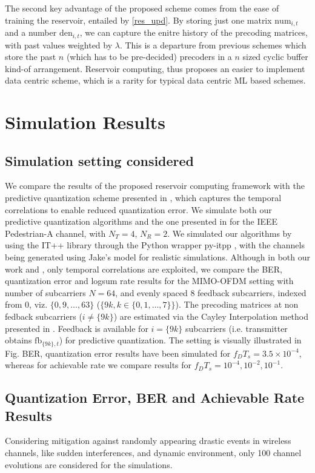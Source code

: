 \documentclass[conference]{IEEEtran}
\begin{document}
The second key advantage of the proposed scheme comes from the ease of training the reservoir, entailed by \eqref{res_upd}.
By storing just one matrix $\text{num}_{i,t}$ and a number $\text{den}_{i,t}$, we can capture the enitre history of the precoding matrices, with past values weighted by $\lambda$.
This is a departure from previous schemes \cite{Gupt1905:Predictive,6891198,6545375} which store the past $n$ (which has to be pre-decided) precoders in a $n$ sized cyclic buffer kind-of arrangement.
Reservoir computing, thus proposes an easier to implement data centric scheme, which is a rarity for typical data centric ML based schemes.


\section{Simulation Results}
\label{section4}
\subsection{Simulation setting considered}
\label{setting}
\noindent We compare the results of the proposed reservoir computing framework with the predictive quantization scheme presented in \cite{6891198}, which captures the temporal correlations to enable reduced quantization error.
We simulate both our predictive quantization algorithms and the one presented in \cite{6891198} for the IEEE Pedestrian-A channel, with $N_T=4$, $N_R=2$. We simulated our algorithms by using the IT++ library through the Python wrapper py-itpp \cite{ViditPy}, with the channels being generated using Jake’s model for realistic simulations. Although in both our work and \cite{6891198}, only temporal correlations are exploited, we compare the BER, quantization error and logsum rate results for the MIMO-OFDM setting with number of subcarriers $N=64$, and evenly spaced $8$ feedback subcarriers, indexed from 0, viz. $\{0,9,\ldots,63\}$ ($\{9k, k \in \{0,1,\ldots,7\}\}$). The precoding matrices at non fedback subcarriers ($i\neq\{9k\}$) are estimated via the Cayley Interpolation method presented in \cite{Gupt1905:Predictive}. Feedback is available for $i=\{9k\}$ subcarriers (i.e. transmitter obtains $\text{fb}_{\{9k\},t}$) for predictive quantization. The setting is visually illustrated in Fig. BER, quantization error results have been simulated for $f_DT_s=3.5\times10^{-4}$, whereas for achievable rate we compare results for $f_DT_s=10^{-4},10^{-2},10^{-1}$. 
\newpage
\subsection{Quantization Error, BER and Achievable Rate Results}
Considering mitigation against randomly appearing drastic events in wireless channels, like sudden interferences, and dynamic environment, only 100 channel evolutions are considered for the simulations. 
\label{res}
\end{document}
